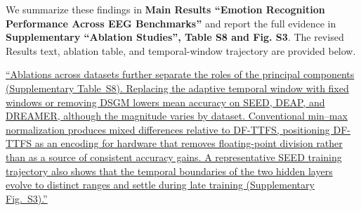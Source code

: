 \documentclass[12pt,technote,onecolumn]{IEEEtran}
\begin{document}
We summarize these findings in \textbf{Main Results ``Emotion Recognition Performance Across EEG Benchmarks''} and report the full evidence in \textbf{Supplementary ``Ablation Studies'', Table S8 and Fig. S3}. The revised Results text, ablation table, and temporal-window trajectory are provided below.

\uline{``Ablations across datasets further separate the roles of the principal components (Supplementary Table~S8). Replacing the adaptive temporal window with fixed windows or removing DSGM lowers mean accuracy on SEED, DEAP, and DREAMER, although the magnitude varies by dataset. Conventional min--max normalization produces mixed differences relative to DF-TTFS, positioning DF-TTFS as an encoding for hardware that removes floating-point division rather than as a source of consistent accuracy gains. A representative SEED training trajectory also shows that the temporal boundaries of the two hidden layers evolve to distinct ranges and settle during late training (Supplementary Fig.~S3).''}
\end{document}
